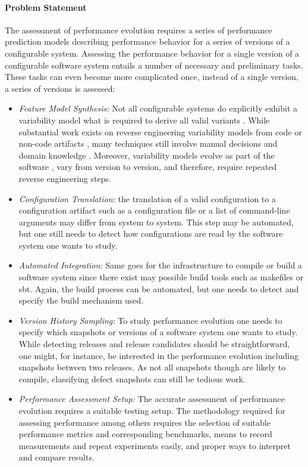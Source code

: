 \paragraph{Problem Statement}
The assessment of performance evolution requires a series of performance
prediction models describing performance behavior for a series of versions of a
configurable system. Assessing the performance behavior for a single version of a
configurable software system entails a number of necessary and preliminary
tasks. These tasks can even become more complicated once, instead of a single
version, a series of versions is assessed:
\begin{itemize}
  \item \emph{Feature Model Synthesis:} Not all configurable systems do
  explicitly exhibit a variability model what is required to derive all valid variants
	\citep{rabkin_static_2011,nadi_where_2015}.
	While substantial work exists on reverse engineering variability models from
	code
	\citep{rabkin_static_2011,she_reverse_2011,zhou_extracting_2015,nadi_where_2015}
	 or non-code artifacts
	\citep{alves_exploratory_2008,andersen_efficient_2012,bakar_feature_2015}, many
	techniques still involve manual decisions \citep{she_reverse_2011} and domain
	knowledge \citep{nadi_where_2015}.
	Moreover, variability models evolve as part of the software
	\citep{peng_analyzing_2011}, vary from version to version, and therefore,
	require repeated reverse engineering steps.
	
	\item \emph{Configuration Translation:} the translation of a valid
	configuration to a configuration artifact such as a configuration file or a list of command-line arguments may differ
from system to system. This step may be automated, but one still needs to
detect how configurations are read by the software system one wants to study.

\item \emph{Automated Integration:} Same goes for the infrastructure to
compile or build a software system since there exist may possible build tools such as makefiles or sbt.
Again, the build process can be automated, but one needs to detect and
specify the build mechanism used.

\item \emph{Version History Sampling:} To study performance evolution one
needs to specify which snapshots or versions of a software system one wants to study. While detecting
releases and release candidates should be straightforward, one might, for
instance, be interested in the performance evolution including snapshots
between two releases. As not all snapshots though are likely to compile,
classifying defect snapshots can still be tedious work.
\item \emph{Performance Assessment Setup:} The accurate assessment of
performance evolution requires a suitable testing setup. The methodology required for assessing performance
among others requires the selection of suitable performance metrics and
corresponding benchmarks, means to record measurements and repeat experiments
easily, and proper ways to interpret and compare results.
\end{itemize}

